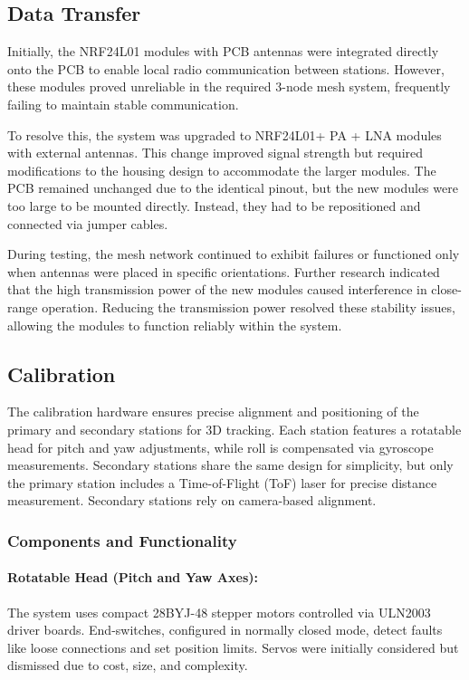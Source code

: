 \subsection{Data Transfer}

Initially, the NRF24L01 modules with PCB antennas were integrated directly onto the PCB to enable local radio communication between stations. However, these modules proved unreliable in the required 3-node mesh system, frequently failing to maintain stable communication.

To resolve this, the system was upgraded to NRF24L01+ PA + LNA modules with external antennas. This change improved signal strength but required modifications to the housing design to accommodate the larger modules. The PCB remained unchanged due to the identical pinout, but the new modules were too large to be mounted directly. Instead, they had to be repositioned and connected via jumper cables.

During testing, the mesh network continued to exhibit failures or functioned only when antennas were placed in specific orientations. Further research indicated that the high transmission power of the new modules caused interference in close-range operation. Reducing the transmission power resolved these stability issues, allowing the modules to function reliably within the system.

\subsection{Calibration}
The calibration hardware ensures precise alignment and positioning of the primary and secondary stations for 3D tracking. Each station features a rotatable head for pitch and yaw adjustments, while roll is compensated via gyroscope measurements. Secondary stations share the same design for simplicity, but only the primary station includes a Time-of-Flight (ToF) laser for precise distance measurement. Secondary stations rely on camera-based alignment.

\subsubsection*{Components and Functionality}

\paragraph{Rotatable Head (Pitch and Yaw Axes):}
The system uses compact 28BYJ-48 stepper motors controlled via ULN2003 driver boards. End-switches, configured in normally closed mode, detect faults like loose connections and set position limits. Servos were initially considered but dismissed due to cost, size, and complexity.

